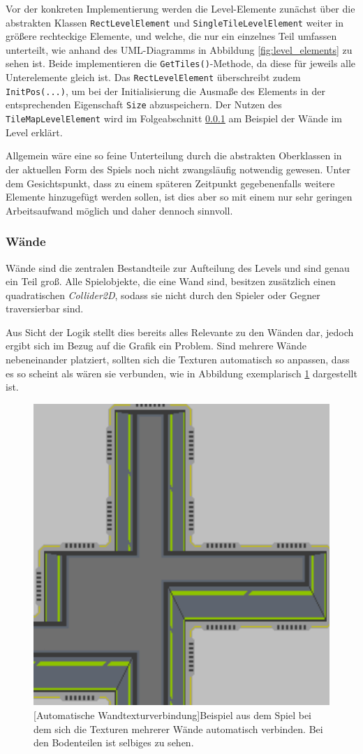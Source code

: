 Vor der konkreten Implementierung werden die Level-Elemente zunächst über die abstrakten Klassen \texttt{RectLevelElement} und \texttt{SingleTileLevelElement} weiter in größere rechteckige Elemente, und welche, die nur ein einzelnes Teil umfassen unterteilt, wie anhand des UML-Diagramms in Abbildung \ref{fig:level_elements} zu sehen ist. Beide implementieren die \texttt{GetTiles()}-Methode, da diese für jeweils alle Unterelemente gleich ist. Das \texttt{RectLevelElement} überschreibt zudem \texttt{InitPos(...)}, um bei der Initialisierung die Ausmaße des Elements in der entsprechenden Eigenschaft \texttt{Size} abzuspeichern. Der Nutzen des \texttt{TileMapLevelElement} wird im Folgeabschnitt \ref{sec:wall} am Beispiel der Wände im Level erklärt.

Allgemein wäre eine so feine Unterteilung durch die abstrakten Oberklassen in der aktuellen Form des Spiels noch nicht zwangsläufig notwendig gewesen. Unter dem Gesichtspunkt, dass zu einem späteren Zeitpunkt gegebenenfalls weitere Elemente hinzugefügt werden sollen, ist dies aber so mit einem nur sehr geringen Arbeitsaufwand möglich und daher dennoch sinnvoll.

\subsubsection{Wände}\label{sec:wall}
Wände sind die zentralen Bestandteile zur Aufteilung des Levels und sind genau ein Teil groß. Alle Spielobjekte, die eine Wand sind, besitzen zusätzlich einen quadratischen \textit{Collider2D}, sodass sie nicht durch den Spieler oder Gegner traversierbar sind.

Aus Sicht der Logik stellt dies bereits alles Relevante zu den Wänden dar, jedoch ergibt sich im Bezug auf die Grafik ein Problem. Sind mehrere Wände nebeneinander platziert, sollten sich die Texturen automatisch so anpassen, dass es so scheint als wären sie verbunden, wie in Abbildung exemplarisch \ref{fig:connected_walls} dargestellt ist.

\begin{figure}[h]
 \centering
 \includegraphics[width=0.3\linewidth]{pics/connected_walls.png}
 [Automatische Wandtexturverbindung]{Beispiel aus dem Spiel bei dem sich die Texturen mehrerer Wände automatisch verbinden. Bei den Bodenteilen ist selbiges zu sehen.}
	\label{fig:connected_walls}
\end{figure}

